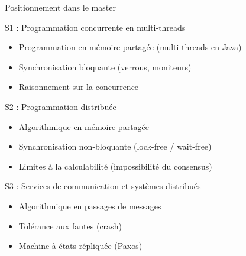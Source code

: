 
\begingroup

\begin{frame}{Positionnement dans le master}

  \begin{block}{S1 : Programmation concurrente en multi-threads}
    \begin{itemize}
    \item Programmation en mémoire partagée (multi-threads en Java)
    \item Synchronisation bloquante (verrous, moniteurs)
    \item Raisonnement sur la concurrence
    \end{itemize}
  \end{block}

  \begin{block}{S2 : Programmation distribuée}
    \begin{itemize}
    \item Algorithmique en mémoire partagée
    \item Synchronisation non-bloquante (lock-free / wait-free)
    \item Limites à la calculabilité (impossibilité du consensus)
    \end{itemize}
  \end{block}

  \begin{block}{S3 : Services de communication et systèmes distribués}
    \begin{itemize}
    \item Algorithmique en passages de messages
    \item Tolérance aux fautes (crash)
    \item Machine à états répliquée (Paxos)
    \end{itemize}
  \end{block}

\end{frame}

\endgroup
\endinput
